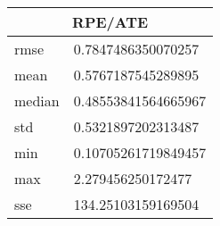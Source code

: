 \begin{table}[!ht] 
 \centering 
 \begin{tabular}{|l|l|} \hline 
 \multicolumn{2}{|c|}{RPE/ATE} \\ \hline 
 rmse & 0.7847486350070257 \\ \hline 
mean & 0.5767187545289895 \\ \hline 
median & 0.48553841564665967 \\ \hline 
std & 0.5321897202313487 \\ \hline 
min & 0.10705261719849457 \\ \hline 
max & 2.279456250172477 \\ \hline 
sse & 134.25103159169504 \\ \hline 
\end{tabular} 
 \end{table}